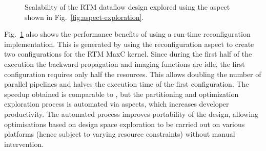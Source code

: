 \begin{figure}[!h]
  \centering
  \caption{Scalability of the RTM dataflow design explored using the aspect 
shown in Fig.~\ref{fig:aspect-exploration}.}
  \label{fig:scalability}
\end{figure}

Fig.~\ref{fig:scalability} also shows the performance benefits of
using a run-time reconfiguration implementation. This is generated by
using the reconfiguration aspect to create two configurations for the
RTM MaxC kernel. Since during the first half of the execution the
backward propagation and imaging functions are idle, the first
configuration requires only half the resources. This allows doubling
the number of parallel pipelines and halves the execution time of the
first configuration. The speedup obtained is comparable to
\cite{Xinyu:Qiwei:Luk:Qiang:Pell:2012}, but the partitioning and
optimization exploration process is automated via aspects, which
increases developer productivity. The automated process improves
portability of the design, allowing optimisations based on design
space exploration to be carried out on various platforms (hence
subject to varying resource constraints) without manual intervention.
